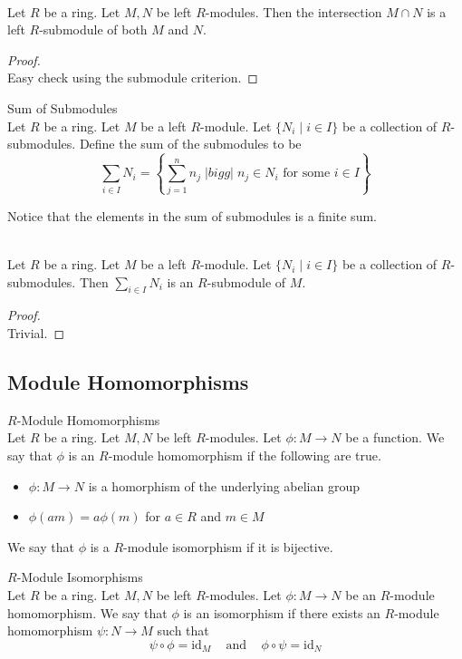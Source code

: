 \documentclass[a4paper]{article}
\begin{document}
\begin{lmm}{}{}\\
Let $R$ be a ring. Let $M,N$ be left $R$-modules. Then the intersection $M\cap N$ is a left $R$-submodule of both $M$ and $N$. 
\begin{proof}\\
Easy check using the submodule criterion. 
\end{proof}
\end{lmm}

\begin{defn}{Sum of Submodules}{}\\
Let $R$ be a ring. Let $M$ be a left $R$-module. Let $\{N_i\;|\;i\in I\}$ be a collection of $R$-submodules. Define the sum of the submodules to be $$\sum_{i\in I}N_i=\left\{\sum_{j=1}^nn_j\;|bigg{|}\;n_j\in N_i\text{ for some }i\in I\right\}$$
\end{defn}

Notice that the elements in the sum of submodules is a finite sum. 

\begin{lmm}{}{}\\
Let $R$ be a ring. Let $M$ be a left $R$-module. Let $\{N_i\;|\;i\in I\}$ be a collection of $R$-submodules. Then $\sum_{i\in I}N_i$ is an $R$-submodule of $M$. 
\begin{proof}\\
Trivial. 
\end{proof}
\end{lmm}

\subsection{Module Homomorphisms}
\begin{defn}{$R$-Module Homomorphisms}{}\\
Let $R$ be a ring. Let $M,N$ be left $R$-modules. Let $\phi:M\to N$ be a function. We say that $\phi$ is an $R$-module homomorphism if the following are true. 
\begin{itemize}
\item $\phi:M\to N$ is a homorphism of the underlying abelian group
\item $\phi(am)=a\phi(m)$ for $a\in R$ and $m\in M$
\end{itemize}
We say that $\phi$ is a $R$-module isomorphism if it is bijective. 
\end{defn}

\begin{defn}{$R$-Module Isomorphisms}{}\\
Let $R$ be a ring. Let $M,N$ be left $R$-modules. Let $\phi:M\to N$ be an $R$-module homomorphism. We say that $\phi$ is an isomorphism if there exists an $R$-module homomorphism $\psi:N\to M$ such that $$\psi\circ\phi=\text{id}_M\;\;\;\text{ and }\;\;\;\phi\circ\psi=\text{id}_N$$
\end{defn}
\end{document}
